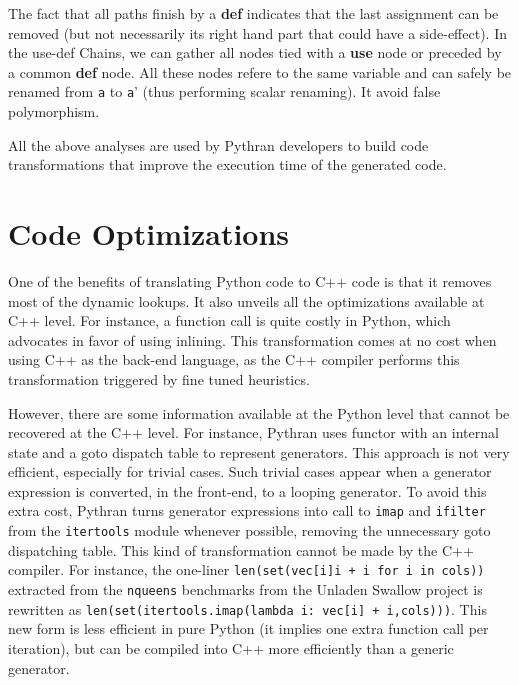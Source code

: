 \documentclass[10pt, onecolumn, preprint]{sigplanconf}
\begin{document}
The fact that all paths finish by a \textbf{def} indicates that the last
assignment can be removed (but not necessarily its right hand part that could
have a side-effect). %
In the use-def Chains, we can gather all nodes tied with a \textbf{use} node or
preceded by a common \textbf{def} node.
All these nodes refere to the same variable and can
safely be renamed from \texttt{a} to \texttt{a}' (thus performing scalar
renaming). It avoid false polymorphism.

All the above analyses are used by Pythran developers to build code
transformations that improve the execution time of the generated code.

\section{Code Optimizations}
\label{sec:optimizations}

One of the benefits of translating Python code to C++ code is that it removes
most of the dynamic lookups. It also unveils all the optimizations available at
C++ level. For instance, a function call is quite costly in Python, which
advocates in favor of using inlining. This transformation comes at no cost when
using C++ as the back-end language, as the C++ compiler performs this 
transformation triggered by fine tuned heuristics.

However, there are some information available at the Python level that cannot
be recovered at the C++ level. For instance, Pythran uses functor with an
internal state and a goto dispatch table to represent generators. This approach
is not very efficient, especially for trivial cases.
Such trivial cases appear when a generator expression is converted, in the
front-end, to a looping generator. To avoid this extra cost, Pythran turns
generator expressions into call to \texttt{imap} and \texttt{ifilter} from the
\texttt{itertools} module whenever possible, removing the unnecessary goto
dispatching table. This kind of transformation cannot be made by the C++
compiler. For instance, the one-liner \texttt{len(set(vec[i]i + i for i in cols))}
extracted from the \texttt{nqueens} benchmarks from the Unladen Swallow project
is rewritten as \texttt{len(set(itertools.imap(lambda i: vec[i] + i,cols)))}.
This new form is less efficient in pure Python (it implies one extra function
call per iteration), but can be compiled into C++ more efficiently than a
generic generator.
\end{document}
